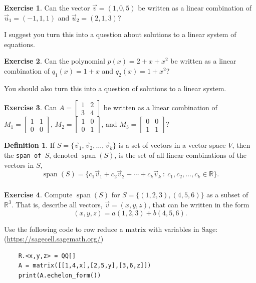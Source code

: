 \documentclass{beamer}
\newcommand{\R}{\mathbb{R}}
\newcommand{\vecv}{\vec{v}}
\newcommand{\fn}{\insertframenumber}
\theoremstyle{definition}
\newtheorem{exercise}{Exercise}
\newtheorem*{defn}{Definition}
\renewcommand{\emph}[1]{{\color{blue}\texttt{#1}}}
\begin{document}
\begin{frame}{\fn}
	\begin{exercise}
		Can the vector $\vec v=(1,0,5)$ be written as a linear combination of $\vec u_1=(-1,1,1)$ and $\vec u_2=(2,1,3)$?
		
		I suggest you turn this into a question about solutions to a linear system of equations.
	\end{exercise}
	\begin{exercise}
		Can the polynomial $p(x)=2+x+x^2$ be written as a linear combination of $q_1(x)=1+x$ and $q_2(x)=1+x^2$?
		
		You should also turn this into a question of solutions to a linear system.
	\end{exercise}
	\begin{exercise}
		Can $A = \begin{bmatrix}1&2\\3&4\end{bmatrix}$ be written as a linear combination of $M_1=\begin{bmatrix}1&1\\0&0\end{bmatrix}$, $M_2=\begin{bmatrix}1&0\\0&1\end{bmatrix}$, and $M_3=\begin{bmatrix}0&0\\1&1\end{bmatrix}$?
	\end{exercise}
\end{frame}
\begin{frame}{\fn}
	\begin{defn}
		If $S=\{\vec v_1,\vec v_2,\dots,\vecv_k\}$ is a set of vectors in a vector space $V$, then the \emph{span of $S$}, denoted $\operatorname{span}(S)$, is the set of all linear combinations of the vectors in $S$,
		\[\operatorname{span}(S)=\{c_1\vec v_1+c_2\vec v_2+\cdots+c_k\vec v_k\ :\ c_1,c_2,\dots,c_k\in\R\}.\]
	\end{defn}
\end{frame}\begin{frame}[fragile]
\frametitle{\fn}
\begin{exercise}
	Compute $\operatorname{span}(S)$ for $S=\{(1,2,3),(4,5,6)\}$ as a subset of $\R^3$. That is, describe all vectors, $\vec v = (x,y,z)$, that can be written in the form
		\[(x,y,z) = a(1,2,3)+ b(4,5,6).\]
	
	Use the following code to row reduce a matrix with variables in Sage: (\url{https://sagecell.sagemath.org/})
	\begin{verbatim}
	R.<x,y,z> = QQ[]
	A = matrix([[1,4,x],[2,5,y],[3,6,z]])
	print(A.echelon_form())
	\end{verbatim}
\end{exercise}
\end{frame}
\end{document}

